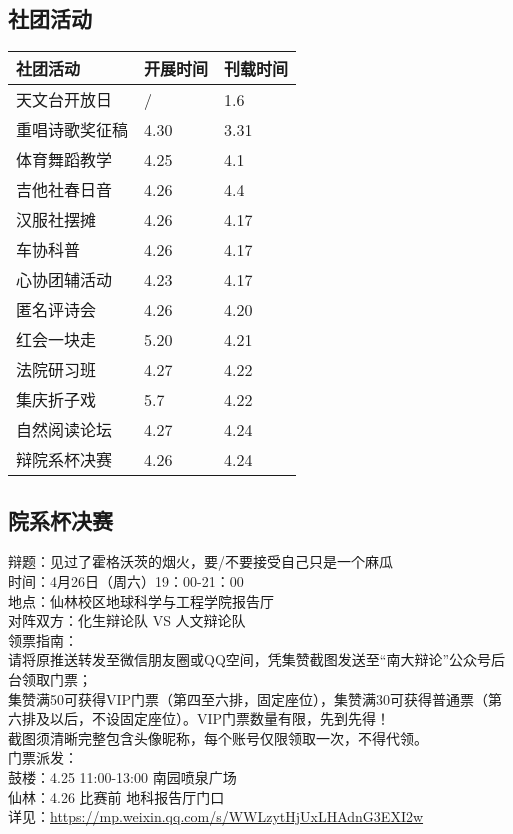 \documentclass[letterpaper, 12pt]{article}
\begin{document}
\begin{multicols}{2}
\section{社团活动}
\begin{tabular}{|>{\centering\arraybackslash}m{}|m{}|m{}|}
    \hline
    社团活动 & 开展时间 & 刊载时间\\
    \hline\hline
    天文台开放日 & / & 1.6\\
    重唱诗歌奖征稿 & 4.30 & 3.31\\
    体育舞蹈教学 & 4.25 & 4.1\\
    吉他社春日音 & 4.26 & 4.4\\
    汉服社摆摊 & 4.26 & 4.17\\
    车协科普 & 4.26 & 4.17\\
    心协团辅活动 & 4.23 & 4.17\\
    匿名评诗会 & 4.26 & 4.20\\
    红会一块走 & 5.20 & 4.21\\
    法院研习班 & 4.27 & 4.22\\
    集庆折子戏 & 5.7 & 4.22\\
    自然阅读论坛 & 4.27 & 4.24\\
    辩院系杯决赛 & 4.26 & 4.24\\
    \hline
\end{tabular}
\subsection{院系杯决赛} %
辩题：见过了霍格沃茨的烟火，要/不要接受自己只是一个麻瓜
\\时间：4月26日（周六）19：00-21：00
\\地点：仙林校区地球科学与工程学院报告厅
\\对阵双方：化生辩论队 VS 人文辩论队
\\领票指南：
\\请将原推送转发至微信朋友圈或QQ空间，凭集赞截图发送至“南大辩论”公众号后台领取门票；
\\集赞满50可获得VIP门票（第四至六排，固定座位），集赞满30可获得普通票（第六排及以后，不设固定座位）。VIP门票数量有限，先到先得！
\\截图须清晰完整包含头像昵称，每个账号仅限领取一次，不得代领。
\\门票派发：
\\鼓楼：4.25 11:00-13:00 南园喷泉广场
\\仙林：4.26 比赛前 地科报告厅门口
\\详见：\url{https://mp.weixin.qq.com/s/WWLzytHjUxLHAdnG3EXI2w}


\end{multicols}
\end{document}
